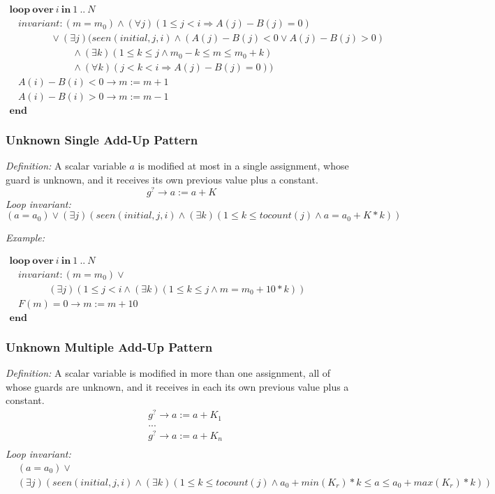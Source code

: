 \documentclass[a4paper,10pt]{article}
\newcommand{\idx}{\ensuremath{i}\xspace}
\newcommand{\idxinitial}{\ensuremath{\mathit{initial}}\xspace}
\newcommand{\KWloop}{\ensuremath{\mathrm{\textbf{loop}}~}}
\newcommand{\KWend}{\ensuremath{\mathrm{\textbf{end}}~}}
\newcommand{\KWover}{\ensuremath{\mathrm{\textbf{over}}~}}
\newcommand{\KWin}{\ensuremath{~\mathrm{\textbf{in}}~}}
\newcommand{\impl}{\ensuremath{\Longrightarrow}}
\newcommand{\seen}[3]{\ensuremath{\mathit{seen}{(#1,#2,#3)}}\xspace}
\newcommand{\tocount}[1]{\ensuremath{\mathit{tocount}(#1)}\xspace}
\newcommand{\loopinvariant}{\noindent\textit{Loop invariant:}\xspace}
\newcommand{\patterndef}{\noindent\textit{Definition:}\xspace}
\newcommand{\patternexample}{\noindent\textit{Example:}\xspace}
\begin{document}
\medskip
$\begin{array}{l}
  \KWloop \KWover i \KWin 1~..~N \\
  ~~~~ \textit{invariant}: (m = m_0) \land (\forall j)(1\leq j < i \impl A(j)-B(j) = 0)\\
  ~~~~~~~~~~~~~~~~~~~ \lor (\exists j)(\seen{\idxinitial}{j}{\idx} \land (A(j)-B(j) < 0 \lor A(j)-B(j) > 0) \\
  ~~~~~~~~~~~~~~~~~~~~~~~~~~~~~ \land (\exists k)(1 \leq k \leq j \land m_0-k \leq m \leq m_0 +k) \\
  ~~~~~~~~~~~~~~~~~~~~~~~~~~~~~ \land (\forall k)(j < k < i \impl A(j)-B(j) = 0))\\
  ~~~~ A(i)-B(i) < 0 \rightarrow m := m+1\\
  ~~~~ A(i)-B(i) > 0 \rightarrow m := m-1\\
  \KWend
\end{array}$

\subsubsection*{Unknown Single Add-Up Pattern}

\patterndef A scalar variable $a$ is modified at most in a single assignment, whose
guard is unknown, and it receives its own previous value plus a constant.
%
$$g^? \rightarrow a := a + K$$
%
\loopinvariant
%
$$(a = a_0) \lor (\exists j)(\seen{\idxinitial}{j}{\idx} \land (\exists k)(1 \leq k \leq \tocount{j} \land a = a_0 + K * k))$$

\bigskip
\patternexample

\medskip
$\begin{array}{l}
  \KWloop \KWover i \KWin 1~..~N \\
  ~~~~ \textit{invariant}: (m = m_0) \lor \\
  ~~~~~~~~~~~~~~~~~~ (\exists j)(1 \leq j < i \land (\exists k)(1 \leq k \leq j \land m = m_0+10*k))\\
  ~~~~ F(m)=0 \rightarrow m := m+10\\
  \KWend
\end{array}$

\subsubsection*{Unknown Multiple Add-Up Pattern}

\patterndef A scalar variable is modified in more than one assignment, all of
whose guards are unknown, and it receives in each its own previous value
plus a constant.
%
\begin{eqnarray*}
&g^? \rightarrow a := a + K_1\\
&...\\
&g^? \rightarrow a := a + K_n\\
\end{eqnarray*}
%
\loopinvariant
%
\begin{eqnarray*}
&(a = a_0) \lor\\
&(\exists j)(\seen{\idxinitial}{j}{\idx} \land (\exists k)(1 \leq k \leq \tocount{j} \land a_0 + \mathit{min}(K_r)*k \leq a \leq a_0 + \mathit{max}(K_r)*k))\\
\end{eqnarray*}
\end{document}
